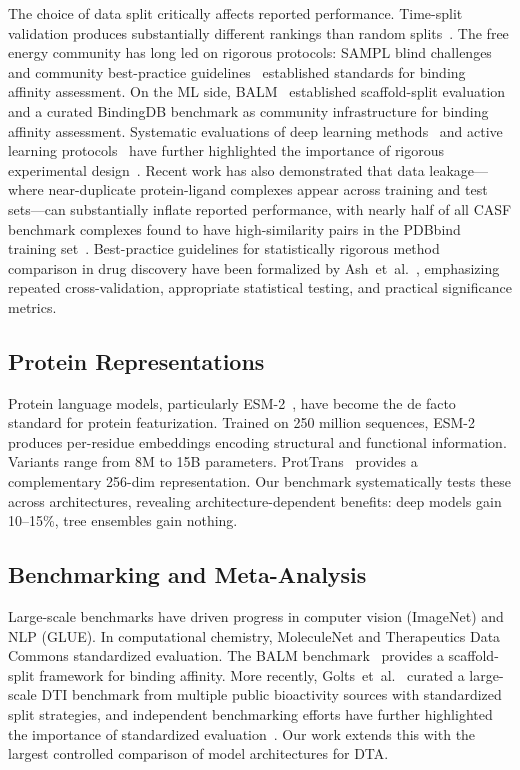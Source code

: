 \documentclass[pmlr,twocolumn]{jmlr}
\begin{document}
The choice of data split critically affects reported performance. Time-split validation produces substantially different rankings than random splits~\citep{sheridan2013timesplit}. The free energy community has long led on rigorous protocols: SAMPL blind challenges~\citep{rizzi2020sampl6} and community best-practice guidelines~\citep{mey2024benchmark} established standards for binding affinity assessment. On the ML side, BALM~\citep{balm2024} established scaffold-split evaluation and a curated BindingDB benchmark as community infrastructure for binding affinity assessment. Systematic evaluations of deep learning methods~\citep{gorantla2023proteins} and active learning protocols~\citep{gorantla2024benchmarking} have further highlighted the importance of rigorous experimental design~\citep{landrum2024ic50}. Recent work has also demonstrated that data leakage---where near-duplicate protein-ligand complexes appear across training and test sets---can substantially inflate reported performance, with nearly half of all CASF benchmark complexes found to have high-similarity pairs in the PDBbind training set~\citep{graber2025databias}. Best-practice guidelines for statistically rigorous method comparison in drug discovery have been formalized by Ash~et~al.~\citep{ash2025protocols}, emphasizing repeated cross-validation, appropriate statistical testing, and practical significance metrics.

\subsection{Protein Representations}

Protein language models, particularly ESM-2~\citep{lin2023esm2}, have become the de facto standard for protein featurization. Trained on 250 million sequences, ESM-2 produces per-residue embeddings encoding structural and functional information. Variants range from 8M to 15B parameters. ProtTrans~\citep{elnaggar2022prottrans} provides a complementary 256-dim representation. Our benchmark systematically tests these across architectures, revealing architecture-dependent benefits: deep models gain 10--15\%, tree ensembles gain nothing.

\subsection{Benchmarking and Meta-Analysis}

Large-scale benchmarks have driven progress in computer vision (ImageNet) and NLP (GLUE). In computational chemistry, MoleculeNet and Therapeutics Data Commons standardized evaluation. The BALM benchmark~\citep{balm2024} provides a scaffold-split framework for binding affinity. More recently, Golts~et~al.~\citep{golts2024largebenchmark} curated a large-scale DTI benchmark from multiple public bioactivity sources with standardized split strategies, and independent benchmarking efforts have further highlighted the importance of standardized evaluation~\citep{gorantla2024benchmarking}. Our work extends this with the largest controlled comparison of model architectures for DTA.
\end{document}
